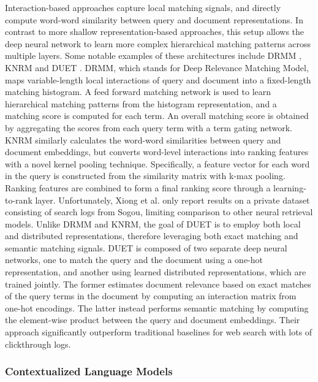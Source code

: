 Interaction-based approaches capture local matching signals, and directly compute word-word similarity between query and document representations.
In contrast to more shallow representation-based approaches, this setup allows the deep neural network to learn more complex hierarchical matching patterns across multiple layers.
Some notable examples of these architectures include DRMM \cite{guo2017drmm}, KNRM \cite{xiong2017knrm} and DUET \cite{mitra2017learning}.
DRMM, which stands for Deep Relevance Matching Model, \cite{guo2017drmm} maps variable-length local interactions of query and document into a fixed-length matching histogram.
A feed forward matching network is used to learn hierarchical matching patterns from the histogram representation, and a matching score is computed for each term.
An overall matching score is obtained by aggregating the scores from each query term with a term gating network.
KNRM \cite{xiong2017knrm} similarly calculates the word-word similarities between query and document embeddings, but converts word-level interactions into ranking features with a novel kernel pooling technique.
Specifically, a feature vector for each word in the query is constructed from the similarity matrix with k-max pooling.
Ranking features are combined to form a final ranking score through a learning-to-rank layer.
Unfortunately, Xiong et al. \cite{xiong2017knrm} only report results on a private dataset consisting of search logs from Sogou, limiting comparison to other neural retrieval models.
Unlike DRMM and KNRM, the goal of DUET \cite{mitra2017learning} is to employ both local and distributed representations, therefore leveraging both exact matching and semantic matching signals.
DUET is composed of two separate deep neural networks, one to match the query and the document using a one-hot representation, and another using learned distributed representations, which are trained jointly.
The former estimates document relevance based on exact matches of the query terms in the document by computing an interaction matrix from one-hot encodings.
The latter instead performs semantic matching by computing the element-wise product between the query and document embeddings.
Their approach significantly outperform traditional baselines for web search with lots of clickthrough logs.

\subsubsection{Contextualized Language Models}

